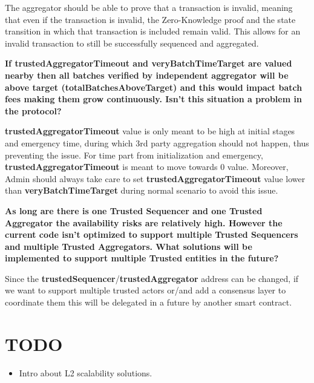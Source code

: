 The aggregator should be able to prove that a transaction is invalid, meaning that even if the transaction is invalid, the Zero-Knowledge proof and the state transition in which that transaction is included remain valid. This allows for an invalid transaction to still be successfully sequenced and aggregated.

\textbf{If trustedAggregatorTimeout and veryBatchTimeTarget are valued nearby then all batches verified by independent aggregator will be above target (totalBatchesAboveTarget) and this would impact batch fees making them grow continuously. Isn't this situation a problem in the protocol?}

\textbf{trustedAggregatorTimeout} value is only meant to be high at initial stages and emergency time, during which 3rd party aggregation should not happen, thus preventing the issue. For time part from initialization and emergency, \textbf{trustedAggregatorTimeout} is meant to move towards 0 value. Moreover, Admin should always take care to set \textbf{trustedAggregatorTimeout} value lower than \textbf{veryBatchTimeTarget} during normal scenario to avoid this issue.

\textbf{As long are there is one Trusted Sequencer and one Trusted Aggregator the availability risks are relatively high. However the current code isn't optimized to support multiple Trusted Sequencers and multiple Trusted Aggregators. What solutions will be implemented to support multiple Trusted entities in the future?}

Since the \textbf{trustedSequencer}/\textbf{trustedAggregator} address can be changed, if we want to support multiple trusted actors or/and add a consensus layer to coordinate them this will be delegated in a future by another smart contract.

\section{TODO}
\begin{itemize}
\item Intro about L2 scalability solutions.
\end{itemize}
\fi
